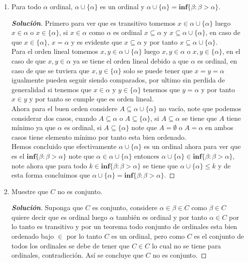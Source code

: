 \documentclass[11pt]{article}
\numberwithin{equation}{section}
\numberwithin{figure}{section}
\begin{document}
\begin{enumerate}
\begin{proof}[\textbf{Solución}]
    \end{proof}
    \item Para todo $\alpha$ ordinal, $\alpha\cup\{\alpha\}$ es un ordinal y $\alpha\cup\{\alpha\}=\textbf{inf}\{\beta:\beta>\alpha\}$.
    \begin{proof}[\textbf{Solución}]
    Primero para ver que es transitivo tomemos $x\in\alpha\cup\{\alpha\}$ luego $x\in\alpha$ o $x\in\{\alpha\}$, si $x\in\alpha$ como $\alpha$ es ordinal $x\subseteq\alpha$ y $x\subseteq\alpha\cup\{\alpha\}$, en caso de que $x\in\{\alpha\}$, $x=\alpha$ y es evidente que $x\subseteq\alpha$ y por tanto $x\subseteq\alpha\cup\{\alpha\}$.\\
    Para el orden lineal tomemos $x,y\in\alpha\cup\{\alpha\}$ luego $x,y\in\alpha$ o $x,y\in\{\alpha\}$, en el caso de que $x,y\in\alpha$ ya se tiene el orden lineal debido a que $\alpha$ es ordinal, en caso de que se tuviera que $x,y\in\{\alpha\}$ solo se puede tener que $x=y=\alpha$ igualmente pueden seguir siendo comparados, por ultimo sin perdida de generalidad si tenemos que $x\in\alpha$ y $y\in\{\alpha\}$ tenemos que $y=\alpha$ y por tanto $x\in y$ y por tanto se cumple que es orden lineal.\\
    Ahora para el buen orden considere $A\subseteq\alpha\cup\{\alpha\}$ no vacío, note que podemos considerar dos casos, cuando $A\subseteq\alpha$ o $A\subseteq\{\alpha\}$, si $A\subseteq\alpha$ se tiene que $A$ tiene mínimo ya que $\alpha$ es ordinal, si $A\subseteq\{\alpha\}$ note que $A=\emptyset$ o $A=\alpha$ en ambos casos tiene elemento mínimo por tanto esta bien ordenado.\\
    Hemos concluido que efectivamente $\alpha\cup\{\alpha\}$ es un ordinal ahora para ver que es el $\textbf{inf}\{\beta:\beta>\alpha\}$ note que $\alpha\in\alpha\cup\{\alpha\}$ entonces $\alpha\cup\{\alpha\}\in\textbf{inf}\{\beta:\beta>\alpha\}$, note ahora que para todo $k\in\textbf{inf}\{\beta:\beta>\alpha\}$ se tiene que $\alpha\cup\{\alpha\}\leq k$ y de esta forma concluimos que $\alpha\cup\{\alpha\}=\textbf{inf}\{\beta:\beta>\alpha\}$.
    \end{proof}
    \item Muestre que $C$ no es conjunto.
    \begin{proof}[\textbf{Solución}]
    Suponga que $C$ es conjunto, considere $\alpha\in\beta\in C$ como $\beta\in C$ quiere decir que es ordinal luego $\alpha$ también es ordinal y por tanto $\alpha\in C$ por lo tanto es transitivo y por un teorema todo conjunto de ordinales esta bien ordenado bajo $\in$ por lo tanto $C$ es un ordinal, pero como $C$ es el conjunto de todos los ordinales se debe de tener que $C\in C$ lo cual no se tiene para ordinales, contradicción. Así se concluye que $C$ no es conjunto.

\end{proof}
\end{enumerate}
\end{document}
